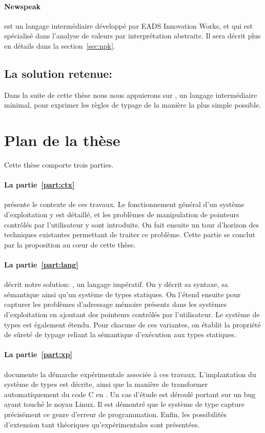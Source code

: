 \paragraph{Newspeak}\cite{newspeak} est un langage intermédiaire développé par
EADS Innovation Works, et qui est spécialisé dans l'analyse de valeurs par
interprétation abstraite. Il sera décrit plus en détails dans la
section~\ref{sec:npk}.

\subsection*{La solution retenue: \langname{}}

Dans la suite de cette thèse nous nous appuierons sur \langname{}, un langage
intermédiaire minimal, pour exprimer les règles de typage de la manière la plus
simple possible.

\section{Plan de la thèse}

Cette thèse comporte trois parties.

\paragraph{La partie~\ref{part:ctx}} présente le contexte de ces travaux. Le
fonctionnement général d'un système d'exploitation y est détaillé, et les
problèmes de manipulation de pointeurs contrôlés par l'utilisateur y sont
introduits. On fait ensuite un tour d'horizon des techniques existantes
permettant de traiter ce problème. Cette partie se conclut par la proposition au
cœur de cette thèse.

\paragraph{La partie~\ref{part:lang}} décrit notre solution: \langname{}, un
langage impératif. On y décrit sa syntaxe, sa sémantique ainsi qu'un système de
types statiques. On l'étend ensuite pour capturer les problèmes d'adressage
mémoire présents dans les systèmes d'exploitation en ajoutant des pointeurs
contrôlés par l'utilisateur. Le système de types est également étendu. Pour
chacune de ces variantes, on établit la propriété de sûreté de typage reliant la
sémantique d'exécution aux types statiques.

\paragraph{La partie~\ref{part:xp}} documente la démarche expérimentale associée
à ces travaux. L'implantation du système de types est décrite, ainsi que la
manière de transformer automatiquement du code C en \langname{}. Un cas d'étude
est déroulé portant sur un bug ayant touché le noyau Linux. Il est démontré que
le système de type capture précisément ce genre d'erreur de programmation.
Enfin, les possibilités d'extension tant théoriques qu'expérimentales sont
présentées.


